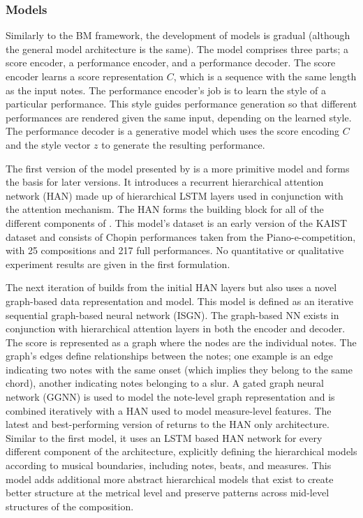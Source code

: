 \subsubsection{Models}
Similarly to the BM framework, the development of \vnet{} models is gradual (although the general model architecture is the same). The model comprises three parts; a score encoder, a performance encoder, and a performance decoder. The score encoder learns a score representation $C$, which is a sequence with the same length as the input notes. The performance encoder's job is to learn the style of a particular performance. This style guides performance generation so that different performances are rendered given the same input, depending on the learned style. The performance decoder is a generative model which uses the score encoding $C$ and the style vector $z$ to generate the resulting performance. 

The first version of the model presented by \citet{jeong2018virtuosonet} is a more primitive model and forms the basis for later versions. It introduces a recurrent hierarchical attention network (HAN) made up of hierarchical LSTM layers used in conjunction with the attention mechanism. The HAN forms the building block for all of the different components of \vnet{}. This model's dataset is an early version of the KAIST dataset and consists of Chopin performances taken from the Piano-e-competition, with 25 compositions and 217 full performances. No quantitative or qualitative experiment results are given in the first formulation. 

The next iteration of \vnet{} builds from the initial HAN layers but also uses a novel graph-based data representation and model. This model is defined as an iterative sequential graph-based neural network (ISGN). The graph-based NN exists in conjunction with hierarchical attention layers in both the encoder and decoder. The score is represented as a graph where the nodes are the individual notes. The graph's edges define relationships between the notes; one example is an edge indicating two notes with the same onset (which implies they belong to the same chord), another indicating notes belonging to a slur. A gated graph neural network (GGNN) is used to model the note-level graph representation and is combined iteratively with a HAN used to model measure-level features. The latest and best-performing version of \vnet{}\cite{jeong2019virtuosonet} returns to the HAN only architecture. Similar to the first \vnet{} model, it uses an LSTM based HAN network for every different component of the architecture, explicitly defining the hierarchical models according to musical boundaries, including notes, beats, and measures. This model adds additional more abstract hierarchical models that exist to create better structure at the metrical level and preserve patterns across mid-level structures of the composition.

